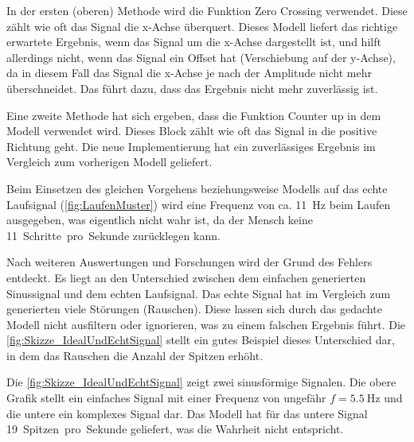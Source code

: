 In der ersten (oberen) Methode wird die Funktion \glqq Zero Crossing\grqq{} verwendet. Diese zählt wie oft das Signal die x-Achse überquert. Dieses Modell liefert das richtige erwartete Ergebnis, wenn das Signal um die x-Achse dargestellt ist, und hilft allerdings nicht, wenn das Signal ein Offset hat (Verschiebung auf der y-Achse), da in diesem Fall das Signal die x-Achse je nach der Amplitude nicht mehr überschneidet. Das führt dazu, dass das Ergebnis nicht mehr zuverlässig ist.

Eine zweite Methode hat sich ergeben, dass die Funktion \glqq Counter up\grqq{} in dem Modell verwendet wird. Dieses Block zählt wie oft das Signal in die positive Richtung geht. Die neue Implementierung hat ein zuverlässiges Ergebnis im Vergleich zum vorherigen Modell geliefert.

Beim Einsetzen des gleichen Vorgehens beziehungsweise Modells auf das echte Laufsignal (\autoref{fig:LaufenMuster}) wird eine Frequenz von ca. \SI{11}{\hertz} beim Laufen ausgegeben, was eigentlich nicht wahr ist, da der Mensch keine \SI{11}{Schritte pro Sekunde} zurücklegen kann.

Nach weiteren Auswertungen und Forschungen wird der Grund des Fehlers entdeckt. Es liegt an den Unterschied zwischen dem einfachen generierten Sinussignal und dem echten Laufsignal. Das echte Signal hat im Vergleich zum generierten viele Störungen (Rauschen). Diese lassen sich durch das gedachte Modell nicht ausfiltern oder ignorieren, was zu einem falschen Ergebnis führt. Die \autoref{fig:Skizze_IdealUndEchtSignal} stellt ein gutes Beispiel dieses Unterschied dar, in dem das Rauschen die Anzahl der Spitzen erhöht.

Die \autoref{fig:Skizze_IdealUndEchtSignal} zeigt zwei sinusförmige Signalen. Die obere Grafik stellt ein einfaches Signal mit einer Frequenz von ungefähr $f = \SI{5,5}{\hertz}$ und die untere ein komplexes Signal dar.
Das Modell hat für das untere Signal \SI{19}{Spitzen pro Sekunde} geliefert, was die Wahrheit nicht entspricht.


